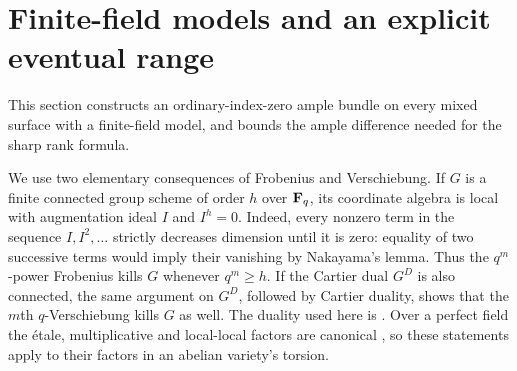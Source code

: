 \section{Finite-field models and an explicit eventual range}
\label{sec:finite-field}

This section constructs an ordinary-index-zero ample bundle on every mixed surface with a finite-field model, and bounds the ample difference needed for the sharp rank formula.

We use two elementary consequences of Frobenius and Verschiebung. If $G$ is a finite connected group scheme of order $h$ over $\mathbf F_q$, its coordinate algebra is local with augmentation ideal $I$ and $I^h=0$. Indeed, every nonzero term in the sequence $I,I^2,\ldots$ strictly decreases dimension until it is zero: equality of two successive terms would imply their vanishing by Nakayama's lemma. Thus the $q^m$-power Frobenius kills $G$ whenever $q^m\ge h$. If the Cartier dual $G^D$ is also connected, the same argument on $G^D$, followed by Cartier duality, shows that the $m$th $q$-Verschiebung kills $G$ as well. The duality used here is \citet[Proposition~5.19 and proof, pp.~79--80]{EGM}. Over a perfect field the \'etale, multiplicative and local-local factors are canonical \citep[Lemma~4.44, Proposition~4.45 and the following paragraph, pp.~67--68]{EGM}, so these statements apply to their factors in an abelian variety's torsion.

